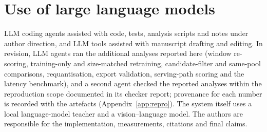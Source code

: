 \section{Use of large language models}
LLM coding agents assisted with code, tests, analysis scripts and notes under author direction, and LLM tools assisted with manuscript drafting and editing. In revision, LLM agents ran the additional analyses reported here (window re-scoring, training-only and size-matched retraining, candidate-filter and same-pool comparisons, requantisation, export validation, serving-path scoring and the latency benchmark), and a second agent checked the reported analyses within the reproduction scope documented in its checker report; provenance for each number is recorded with the artefacts (Appendix~\ref{app:repro}). The system itself uses a local language-model teacher and a vision--language model. The authors are responsible for the implementation, measurements, citations and final claims. %


